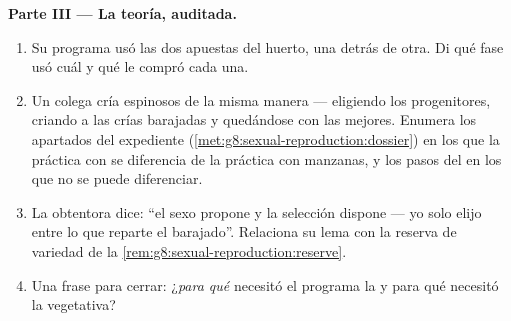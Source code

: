 \begin{problem}
\medskip\noindent\textbf{Parte III --- La teoría, auditada.}
\begin{enumerate}[resume]
  \item Su programa usó las dos apuestas del huerto, una detrás de
        otra. Di qué fase usó cuál y qué le compró cada una.
  \item Un colega cría espinosos de la misma manera --- eligiendo los
        progenitores, criando a las crías barajadas y quedándose con
        las mejores. Enumera los apartados del expediente
        (\cref{met:g8:sexual-reproduction:dossier}) en los que la
        práctica con  se diferencia de la práctica con manzanas, y
        los pasos del  en los que no se puede diferenciar.
  \item La obtentora dice: ``el sexo propone y la selección dispone ---
        yo solo elijo entre lo que reparte el barajado''. Relaciona su
        lema con la reserva de variedad de la
        \cref{rem:g8:sexual-reproduction:reserve}.
  \item Una frase para cerrar: ¿\emph{para qué} necesitó el programa la
         y para qué necesitó la vegetativa?
\end{enumerate}
\end{problem}
